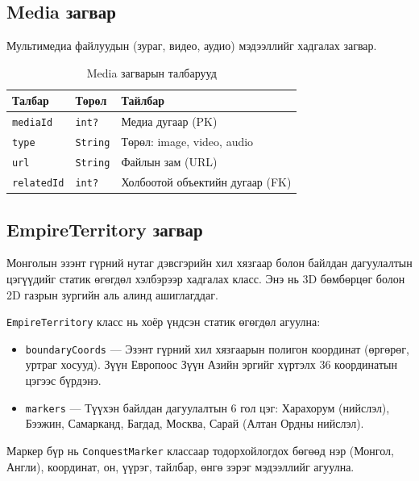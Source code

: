 \subsection{Media загвар}

Мультимедиа файлуудын (зураг, видео, аудио) мэдээллийг хадгалах загвар.

\begin{table}[htbp]
\centering
\begin{tabular}{|p{3cm}|p{3cm}|p{7.5cm}|}
\hline
\textbf{Талбар} & \textbf{Төрөл} & \textbf{Тайлбар} \\
\hline
\texttt{mediaId} & \texttt{int?} & Медиа дугаар (PK) \\
\hline
\texttt{type} & \texttt{String} & Төрөл: image, video, audio \\
\hline
\texttt{url} & \texttt{String} & Файлын зам (URL) \\
\hline
\texttt{relatedId} & \texttt{int?} & Холбоотой объектийн дугаар (FK) \\
\hline
\end{tabular}
\caption{Media загварын талбарууд}
\label{tab:media_model}
\end{table}

\subsection{EmpireTerritory загвар}

Монголын эзэнт гүрний нутаг дэвсгэрийн хил хязгаар болон байлдан дагуулалтын цэгүүдийг статик өгөгдөл хэлбэрээр хадгалах класс. Энэ нь 3D бөмбөрцөг болон 2D газрын зургийн аль алинд ашиглагддаг.

\texttt{EmpireTerritory} класс нь хоёр үндсэн статик өгөгдөл агуулна:

\begin{itemize}
	\item \texttt{boundaryCoords} — Эзэнт гүрний хил хязгаарын полигон координат (өргөрөг, уртраг хосууд). Зүүн Европоос Зүүн Азийн эргийг хүртэлх 36 координатын цэгээс бүрдэнэ.
	\item \texttt{markers} — Түүхэн байлдан дагуулалтын 6 гол цэг: Харахорум (нийслэл), Бээжин, Самарканд, Багдад, Москва, Сарай (Алтан Ордны нийслэл).
\end{itemize}

Маркер бүр нь \texttt{ConquestMarker} классаар тодорхойлогдох бөгөөд нэр (Монгол, Англи), координат, он, үүрэг, тайлбар, өнгө зэрэг мэдээллийг агуулна.

